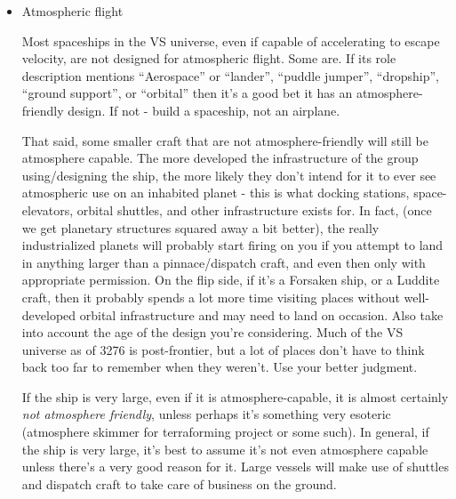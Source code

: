 \begin{itemize}
\item Atmospheric flight

Most spaceships in the VS universe, even if capable of accelerating to
escape velocity, are not designed for atmospheric flight. Some are. If
its role description mentions ``Aerospace'' or ``lander'', ``puddle
jumper'', ``dropship'', ``ground support'', or ``orbital'' then it's a good
bet it has an atmosphere-friendly design. If not - build a spaceship,
not an airplane.

That said, some smaller craft that are not atmosphere-friendly will
still be atmosphere capable. The more developed the infrastructure of
the group using/designing the ship, the more likely they don't intend
for it to ever see atmospheric use on an inhabited planet - this is
what docking stations, space-elevators, orbital shuttles, and other
infrastructure exists for. In fact, (once we get planetary structures
squared away a bit better), the really industrialized planets will
probably start firing on you if you attempt to land in anything larger
than a pinnace/dispatch craft, and even then only with appropriate
permission. On the flip side, if it's a Forsaken ship, or a Luddite
craft, then it probably spends a lot more time visiting places without
well-developed orbital infrastructure and may need to land on
occasion. Also take into account the age of the design you're
considering. Much of the VS universe as of 3276 is post-frontier, but
a lot of places don't have to think back too far to remember when they
weren't. Use your better judgment.

If the ship is very large, even if it is atmosphere-capable, it is
almost certainly {\em not atmosphere friendly}, unless perhaps it's
something very esoteric (atmosphere skimmer for terraforming project
or some such). In general, if the ship is very large, it's best to
assume it's not even atmosphere capable unless there's a very good
reason for it. Large vessels will make use of shuttles and dispatch
craft to take care of business on the ground.

\end{itemize}







     

             
             
     


                  
               
                 
                 


 


 









